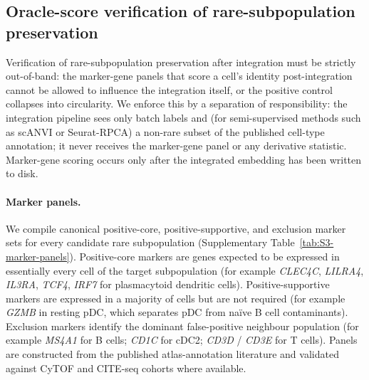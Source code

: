 
\subsection{Oracle-score verification of rare-subpopulation preservation}
\label{sec:methods-oracle-score}

Verification of rare-subpopulation preservation after integration must
be strictly out-of-band: the marker-gene panels that score a cell's
identity post-integration cannot be allowed to influence the integration
itself, or the positive control collapses into circularity. We enforce
this by a separation of responsibility: the integration pipeline sees
only batch labels and (for semi-supervised methods such as scANVI or
Seurat-RPCA) a non-rare subset of the published cell-type annotation;
it never receives the marker-gene panel or any derivative statistic.
Marker-gene scoring occurs only after the integrated embedding has
been written to disk.

\paragraph*{Marker panels.}
We compile canonical positive-core, positive-supportive, and exclusion
marker sets for every candidate rare subpopulation (Supplementary
Table~\ref{tab:S3-marker-panels}). Positive-core markers are genes
expected to be expressed in essentially every cell of the target
subpopulation (for example \emph{CLEC4C}, \emph{LILRA4}, \emph{IL3RA},
\emph{TCF4}, \emph{IRF7} for plasmacytoid dendritic cells).
Positive-supportive markers are expressed in a majority of cells but
are not required (for example \emph{GZMB} in resting pDC, which
separates pDC from naïve B cell contaminants).
Exclusion markers identify the dominant false-positive neighbour
population (for example \emph{MS4A1} for B cells; \emph{CD1C} for
cDC2; \emph{CD3D} / \emph{CD3E} for T cells). Panels are constructed
from the published atlas-annotation literature
\citep{villani2017single, dominguez2022crosstissue, cheng2021pancancer}
and validated against CyTOF and CITE-seq cohorts where available.

